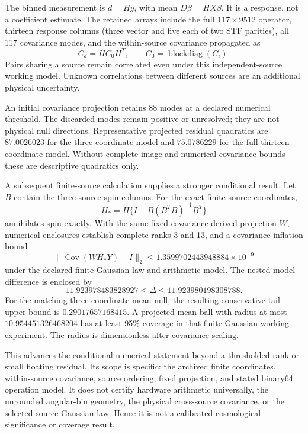 The binned measurement is $d=Hy$, with mean $D\beta=HX\beta$. It is a response, not a coefficient estimate. The retained arrays include the full $117\times9512$ operator, thirteen response columns (three vector and five each of two STF parities), all 117 covariance modes, and the within-source covariance propagated as
\begin{equation}
 C_d=HC_0H^T,\qquad C_0=\operatorname{blockdiag}(C_i).
\end{equation}
Pairs sharing a source remain correlated even under this independent-source working model. Unknown correlations between different sources are an additional physical uncertainty.

An initial covariance projection retains 88 modes at a declared numerical threshold. The discarded modes remain positive or unresolved; they are not physical null directions. Representative projected residual quadratics are $87.0026023$ for the three-coordinate model and $75.0786229$ for the full thirteen-coordinate model. Without complete-image and numerical covariance bounds these are descriptive quadratics only.

A subsequent finite-source calculation supplies a stronger conditional result. Let $B$ contain the three source-spin columns. For the exact finite source coordinates,
\begin{equation}
 H_* =H\{I-B(B^TB)^{-1}B^T\}
 \label{eq:spinquotient}
\end{equation}
annihilates spin exactly. With the same fixed covariance-derived projection $W$, numerical enclosures establish complete ranks 3 and 13, and a covariance inflation bound
\begin{equation}
 \|\operatorname{Cov}(WH_*Y)-I\|_2
 \leq1.3599702443948884\times10^{-9}
\end{equation}
under the declared finite Gaussian law and arithmetic model. The nested-model difference is enclosed by
\begin{equation}
 11.923978483828927\leq\Delta\leq11.923980198308788.
\end{equation}
For the matching three-coordinate mean null, the resulting conservative tail upper bound is $0.29017657168415$. A projected-mean ball with radius at most $10.954451326468204$ has at least 95\% coverage in that finite Gaussian working experiment. The radius is dimensionless after covariance scaling.

This advances the conditional numerical statement beyond a thresholded rank or small floating residual. Its scope is specific: the archived finite coordinates, within-source covariance, source ordering, fixed projection, and stated binary64 operation model. It does not certify hardware arithmetic universally, the unrounded angular-bin geometry, the physical cross-source covariance, or the selected-source Gaussian law. Hence it is not a calibrated cosmological significance or coverage result.

